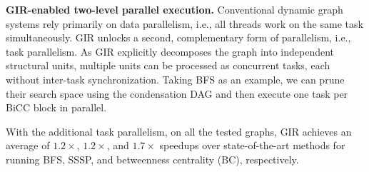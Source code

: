 \textbf{GIR-enabled two-level parallel execution.}
Conventional dynamic graph systems rely primarily on data parallelism,
i.e., all threads work
on the same task simultaneously.
GIR unlocks a second, complementary form of parallelism, i.e., task parallelism.
As GIR explicitly decomposes the graph into independent structural units, multiple
units can be processed as concurrent tasks, each without inter-task synchronization.
Taking BFS as an example,
we can prune their search space using the condensation DAG and then execute one task per BiCC block in parallel.
\begin{maybecut}
With the additional task parallelism,
on all the tested graphs, GIR achieves an average of $1.2\times$, $1.2\times$, and $1.7\times$ speedups over state-of-the-art methods for running BFS, SSSP, and betweenness centrality (BC), respectively.
\end{maybecut}








